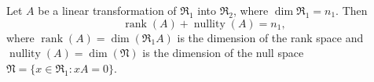Let $A$ be a linear transformation of $\mathfrak{R}_1$ into $\mathfrak{R}_2$, where $\dim \mathfrak{R}_1 = n_1$. Then
$$
\operatorname{rank}(A) + \operatorname{nullity}(A) = n_1,
$$
where $\operatorname{rank}(A) = \dim(\mathfrak{R}_1 A)$ is the dimension of the rank space and $\operatorname{nullity}(A) = \dim(\mathfrak{N})$ is the dimension of the null space $\mathfrak{N} = \{x \in \mathfrak{R}_1 : xA = 0\}$.
